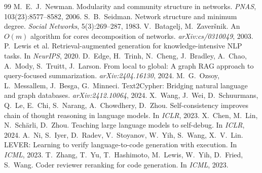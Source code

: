 \documentclass[11pt]{article}
\begin{document}
\begin{thebibliography}{99}
 M.~E.~J.~Newman. Modularity and community structure in networks. \textit{PNAS}, 103(23):8577--8582, 2006.
 S.~B.~Seidman. Network structure and minimum degree. \textit{Social Networks}, 5(3):269--287, 1983.
 V.~Batagelj, M.~Zaver\v{s}nik. An $O(m)$ algorithm for cores decomposition of networks. \textit{arXiv:cs/0310049}, 2003.
 P.~Lewis et al. Retrieval-augmented generation for knowledge-intensive NLP tasks. In \textit{NeurIPS}, 2020.
 D.~Edge, H.~Trinh, N.~Cheng, J.~Bradley, A.~Chao, A.~Mody, S.~Truitt, J.~Larson. From local to global: A graph RAG approach to query-focused summarization. \textit{arXiv:2404.16130}, 2024.
 M.~G.~Ozsoy, L.~Messallem, J.~Besga, G.~Minneci. Text2Cypher: Bridging natural language and graph databases. \textit{arXiv:2412.10064}, 2024.
 X.~Wang, J.~Wei, D.~Schuurmans, Q.~Le, E.~Chi, S.~Narang, A.~Chowdhery, D.~Zhou. Self-consistency improves chain of thought reasoning in language models. In \textit{ICLR}, 2023.
 X.~Chen, M.~Lin, N.~Sch\"{a}rli, D.~Zhou. Teaching large language models to self-debug. In \textit{ICLR}, 2024.
 A.~Ni, S.~Iyer, D.~Radev, V.~Stoyanov, W.~Yih, S.~Wang, X.~V.~Lin. LEVER: Learning to verify language-to-code generation with execution. In \textit{ICML}, 2023.
 T.~Zhang, T.~Yu, T.~Hashimoto, M.~Lewis, W.~Yih, D.~Fried, S.~Wang. Coder reviewer reranking for code generation. In \textit{ICML}, 2023.
\end{thebibliography}
\endgroup
\end{document}

